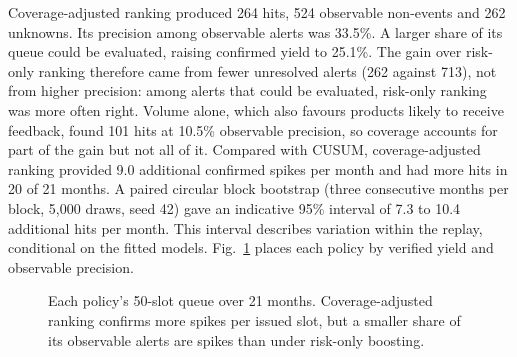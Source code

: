\documentclass[conference]{IEEEtran}
\begin{document}
Coverage-adjusted ranking produced 264 hits, 524 observable non-events and 262 unknowns. Its precision among observable alerts was 33.5\%. A larger share of its queue could be evaluated, raising confirmed yield to 25.1\%. The gain over risk-only ranking therefore came from fewer unresolved alerts (262 against 713), not from higher precision: among alerts that could be evaluated, risk-only ranking was more often right. Volume alone, which also favours products likely to receive feedback, found 101 hits at 10.5\% observable precision, so coverage accounts for part of the gain but not all of it. Compared with CUSUM, coverage-adjusted ranking provided 9.0 additional confirmed spikes per month and had more hits in 20 of 21 months. A paired circular block bootstrap (three consecutive months per block, 5,000 draws, seed 42) gave an indicative 95\% interval of 7.3 to 10.4 additional hits per month. This interval describes variation within the replay, conditional on the fitted models. Fig.~\ref{fig:tradeoff} places each policy by verified yield and observable precision.

\begin{figure}[t]
\centering
{}
\caption{Each policy's 50-slot queue over 21 months. Coverage-adjusted ranking confirms more spikes per issued slot, but a smaller share of its observable alerts are spikes than under risk-only boosting.}
\label{fig:tradeoff}
\end{figure}
\end{document}
